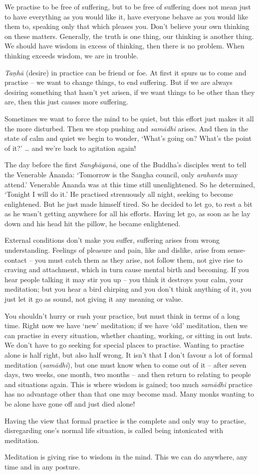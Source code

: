 We practise to be free of suffering, but to be free of suffering does
not mean just to have everything as you would like it, have everyone
behave as you would like them to, speaking only that which pleases you. 
Don't believe your own thinking on these matters. Generally, the truth
is one thing, our thinking is another thing. We should have wisdom in
excess of thinking, then there is no problem. When thinking exceeds
wisdom, we are in trouble. 

\emph{Taṇhā} (desire) in practice can be friend or foe. At first it
spurs us to come and practise -- we want to change things, to end
suffering. But if we are always desiring something that hasn't yet
arisen, if we want things to be other than they are, then this just
causes more suffering. 

Sometimes we want to force the mind to be quiet, but this effort just
makes it all the more disturbed. Then we stop pushing and \emph{samādhi}
arises. And then in the state of calm and quiet we begin to
wonder, `What's going on? What's the point of it?' \ldots{} and we're
back to agitation again! 

The day before the first \emph{Sanghāyanā}, one of the Buddha's
disciples went to tell the Venerable Ānanda: `Tomorrow is the Sangha
council, only \emph{arahants} may attend.' Venerable Ānanda was at this
time still unenlightened. So he determined, `Tonight I will do it.' He
practised strenuously all night, seeking to become enlightened. But he
just made himself tired. So he decided to let go, to rest a bit as he
wasn't getting anywhere for all his efforts. Having let go, as soon as
he lay down and his head hit the pillow, he became enlightened. 

External conditions don't make you suffer, suffering arises from wrong
understanding. Feelings of pleasure and pain, like and dislike, arise
from sense-contact -- you must catch them as they arise, not follow
them, not give rise to craving and attachment, which in turn cause
mental birth and becoming. If you hear people talking it may stir you up
-- you think it destroys your calm, your meditation; but you hear a bird
chirping and you don't think anything of it, you just let it go as
sound, not giving it any meaning or value. 

You shouldn't hurry or rush your practice, but must think in terms of a
long time. Right now we have `new' meditation; if we have `old'
meditation, then we can practise in every situation, whether chanting, 
working, or sitting in out huts. We don't have to go seeking for special
places to practise. Wanting to practise alone is half right, but also
half wrong. It isn't that I don't favour a lot of formal meditation
 (\emph{samādhi}), but one must know when to come out of it -- after
seven days, two weeks, one month, two months -- and then return to
relating to people and situations again. This is where wisdom is gained; 
too much \emph{samādhi} practice has no advantage other than that one
may become mad. Many monks wanting to be alone have gone off and just
died alone! 

Having the view that formal practice is the complete and only way to
practise, disregarding one's normal life situation, is called being
intoxicated with meditation. 

Meditation is giving rise to wisdom in the mind. This we can do
anywhere, any time and in any posture. 


